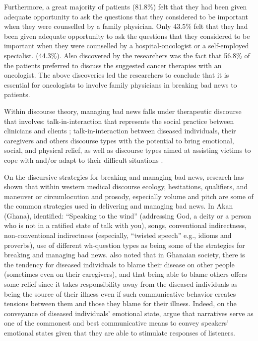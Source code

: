\documentclass[output=paper,colorlinks,citecolor=brown]{langscibook}
\begin{document}
Furthermore, a great majority of patients (81.8\%) felt that they had been given adequate opportunity to ask the questions that they considered to be important when they were counselled by a family physician. Only 43.5\% felt that they had been given adequate opportunity to ask the questions that they considered to be important when they were counselled by a hospital‐oncologist or a self‐employed specialist. (44.3\%). Also discovered by the researchers was the fact that 56.8\% of the patients preferred to discuss the suggested cancer therapies with an oncologist. The above discoveries led the researchers to conclude that it is essential for oncologists to involve family physicians in breaking bad news to patients. 

Within discourse theory, managing bad news falls under therapeutic discourse that involves: talk-in-interaction that represents the social practice between clinicians and clients \citep{Leahy2004}; talk-in-interaction between diseased individuals, their caregivers and others discourse types with the potential to bring emotional, social, and physical relief, as well as discourse types aimed at assisting victims to cope with and/or adapt to their difficult situations \citep{Obeng2008}. 

On the discursive strategies for breaking and managing bad news, research has shown that within western medical discourse ecology, hesitations, qualifiers, and maneuver or circumlocution \citep{Maynard2003, BrownEtAl2009} and prosody, especially volume and pitch \citep{MaynardFreese2012} are some of the common strategies used in delivering and managing bad news. In Akan (Ghana), \citet{Obeng2008} identified: “Speaking to the wind” (addressing God, a deity or a person who is not in a ratified state of talk with you), songs, conventional indirectness, non-conventional indirectness (especially, “twisted speech” e.g., idioms and proverbs), use of different wh-question types as being some of the strategies for breaking and managing bad news. \citeauthor{Obeng2008} also noted that in Ghanaian society, there is the tendency for diseased individuals to blame their disease on other people (sometimes even on their caregivers), and that being able to blame others offers some relief since it takes responsibility away from the diseased individuals as being the source of their illness even if such communicative behavior creates tensions between them and those they blame for their illness. Indeed, on the conveyance of diseased individuals’ emotional state, \citet{KalmykovaMergenthaler1998} argue that narratives serve as one of the commonest and best communicative means to convey speakers’ emotional states given that they are able to stimulate responses of listeners. 
\end{document}

